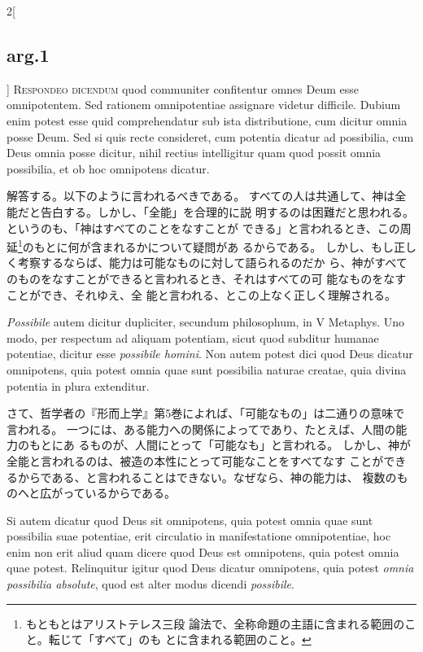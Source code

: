\documentclass[paper=a4paper,fontsize=10pt,jafontsize=9pt,titlepage]{jlreq}
\begin{document}
\begin{paracol}{2}[\subsection{arg.1}]
{\scshape Respondeo dicendum} quod communiter confitentur
omnes Deum esse omnipotentem. Sed rationem omnipotentiae assignare
videtur difficile. Dubium enim potest esse quid comprehendatur sub ista
distributione, cum dicitur omnia posse Deum. Sed si quis recte
consideret, cum potentia dicatur ad possibilia, cum Deus omnia posse
dicitur, nihil rectius intelligitur quam quod possit omnia possibilia,
et ob hoc omnipotens dicatur.

\switchcolumn

解答する。以下のように言われるべきである。
すべての人は共通して、神は全能だと告白する。しかし、「全能」を合理的に説
 明するのは困難だと思われる。というのも、「神はすべてのことをなすことが
 できる」と言われるとき、この周延\footnote{もともとはアリストテレス三段
 論法で、全称命題の主語に含まれる範囲のこと。転じて「すべて」のも
 とに含まれる範囲のこと。}のもとに何が含まれるかについて疑問があ
 るからである。
しかし、もし正しく考察するならば、能力は可能なものに対して語られるのだか
 ら、神がすべてのものをなすことができると言われるとき、それはすべての可
 能なものをなすことができ、それゆえ、全
 能と言われる、とこの上なく正しく理解される。

\switchcolumn*

{\itshape Possibile} autem dicitur dupliciter,
secundum philosophum, in V Metaphys. Uno modo, per respectum ad aliquam
potentiam, sicut quod subditur humanae potentiae, dicitur esse {\itshape possibile
homini}. Non autem potest dici quod Deus dicatur omnipotens, quia potest
omnia quae sunt possibilia naturae creatae, quia divina potentia in
plura extenditur.

\switchcolumn

さて、哲学者の『形而上学』第5巻によれば、「可能なもの」は二通りの意味で
 言われる。
一つには、ある能力への関係によってであり、たとえば、人間の能力のもとにあ
 るものが、人間にとって「可能なも」と言われる。
しかし、神が全能と言われるのは、被造の本性にとって可能なことをすべてなす
 ことができるからである、と言われることはできない。なぜなら、神の能力は、
 複数のものへと広がっているからである。

\switchcolumn*

Si autem dicatur quod Deus sit omnipotens, quia potest
omnia quae sunt possibilia suae potentiae, erit circulatio in
manifestatione omnipotentiae, hoc enim non erit aliud quam dicere quod
Deus est omnipotens, quia potest omnia quae potest. Relinquitur igitur
quod Deus dicatur omnipotens, quia potest {\itshape omnia possibilia absolute},
quod est alter modus dicendi {\itshape possibile}.


\end{paracol}
\end{document}
